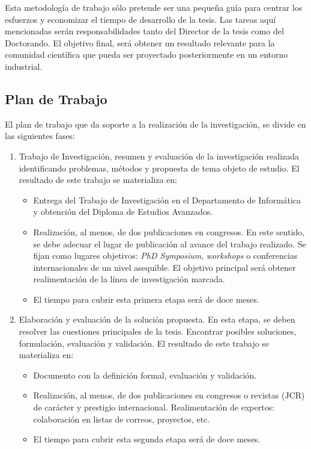 Esta metodología de trabajo sólo pretende ser una pequeña guía para centrar los esfuerzos y 
economizar el tiempo de desarrollo de la tesis. Las tareas aquí mencionadas serán 
responsabilidades tanto del Director de la tesis como del Doctorando. El objetivo final, será obtener un 
resultado relevante para la comunidad científica que pueda ser proyectado posteriormente 
en un entorno industrial.

\subsection{Plan de Trabajo}
El plan de trabajo que da soporte a la realización de la investigación, se divide en las siguientes fases:
\begin{enumerate}
 \item Trabajo de Investigación, resumen y evaluación de la investigación realizada identificando problemas, métodos y propuesta de tema objeto
de estudio. El resultado de este trabajo se materializa en:
  \begin{itemize}
   \item Entrega del Trabajo de Investigación en el Departamento de Informática y obtención del Diploma de Estudios Avanzados.
   \item Realización, al menos, de dos publicaciones en congresos. En este sentido, se debe adecuar el lugar de publicación al 
    avance del trabajo realizado. Se fijan como lugares objetivos: \textit{PhD Symposium}, \textit{workshops} o conferencias internacionales 
    de un nivel asequible. El objetivo principal será obtener realimentación de la línea de investigación marcada.
  \item El tiempo para cubrir esta primera etapa será de doce meses.
  \end{itemize}
\item Elaboración y evaluación de la solución propuesta. En esta etapa, se deben resolver las cuestiones principales de la tesis. 
  Encontrar posibles soluciones, formulación, evaluación y validación. El resultado de este trabajo se materializa en:
 \begin{itemize}
  \item Documento con la definición formal, evaluación y validación.
  \item Realización, al menos, de dos publicaciones en congresos o revistas (JCR) de carácter y prestigio internacional. 
  Realimentación de  expertos: colaboración en listas de correos, proyectos, etc.
  \item El tiempo para cubrir esta segunda etapa será de doce meses.

\end{itemize}
\end{enumerate}
